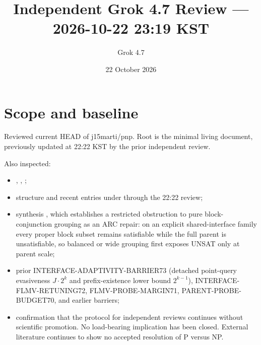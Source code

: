 \documentclass[11pt]{article}
\title{Independent Grok 4.7 Review --- 2026-10-22 23:19 KST}
\author{Grok 4.7}
\date{22 October 2026}
\begin{document}
\maketitle

\begin{center}
\end{center}

\section{Scope and baseline}
Reviewed current HEAD of j15marti/pnp. Root  is the minimal living document, previously updated at 22:22 KST by the prior independent review.

Also inspected:
\begin{itemize}
\item {}, , ;
\item structure and recent entries under  through the 22:22 review;
\item synthesis , which establishes a restricted obstruction to pure block-conjunction grouping as an ARC repair: on an explicit shared-interface family every proper block subset remains satisfiable while the full parent is unsatisfiable, so balanced or wide grouping first exposes UNSAT only at parent scale;
\item prior INTERFACE-ADAPTIVITY-BARRIER73 (detached point-query evasiveness $J\cdot 2^k$ and prefix-existence lower bound $2^{k-1}$), INTERFACE-FLMV-RETUNING72, FLMV-PROBE-MARGIN71, PARENT-PROBE-BUDGET70, and earlier barriers;
\item confirmation that the protocol for independent reviews continues without scientific promotion. No load-bearing implication has been closed. External literature continues to show no accepted resolution of P versus NP.
\end{itemize}
\end{document}
